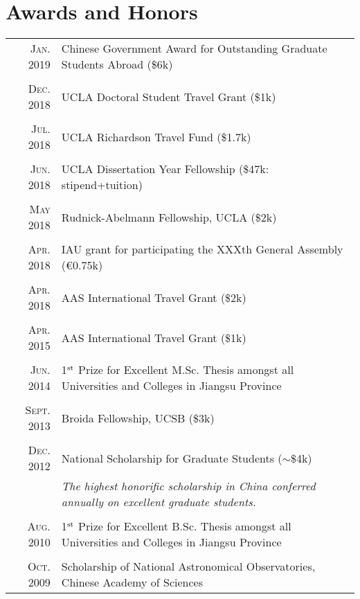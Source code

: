 \documentclass[letterpaper,10pt]{article}
\newcommand{\narrow}{-1.8ex}
\newcommand{\textwrap}{5.8in}       %
\begin{document}
\section{Awards and Honors}

\vspace*{-.5em}
\begin{longtable}{r|p{\textwrap}}

    \textsc{Jan. 2019} & Chinese Government Award for Outstanding Graduate Students Abroad (\$6k)   \\
    \multicolumn{2}{c}{} \\[\narrow]
    \textsc{Dec. 2018} & UCLA Doctoral Student Travel Grant (\$1k)   \\
    \multicolumn{2}{c}{} \\[\narrow]
    \textsc{Jul. 2018} & UCLA Richardson Travel Fund (\$1.7k)   \\
    \multicolumn{2}{c}{} \\[\narrow]
    \textsc{Jun. 2018} & UCLA Dissertation Year Fellowship (\$47k: stipend+tuition)    \\
    \multicolumn{2}{c}{} \\[\narrow]
    \textsc{May 2018} & Rudnick-Abelmann Fellowship, UCLA (\$2k)      \\
    \multicolumn{2}{c}{} \\[\narrow]
    \textsc{Apr. 2018} & IAU grant for participating the XXXth General Assembly (\euro0.75k)  \\
    \multicolumn{2}{c}{} \\[\narrow]
    \textsc{Apr. 2018} & AAS International Travel Grant (\$2k)    \\
    \multicolumn{2}{c}{} \\[\narrow]
    \textsc{Apr. 2015} & AAS International Travel Grant (\$1k)    \\
    \multicolumn{2}{c}{} \\[\narrow]
    \textsc{Jun. 2014} & 1$^{\rm st}$ Prize for Excellent M.Sc. Thesis amongst all Universities and Colleges in Jiangsu Province \\
    \multicolumn{2}{c}{} \\[\narrow]
    \textsc{Sept. 2013} & Broida Fellowship, UCSB (\$3k)  \\
    \multicolumn{2}{c}{} \\[\narrow]
    \textsc{Dec. 2012} & National Scholarship for Graduate Students ($\sim$\$4k)  \\
                     & {\it The highest honorific scholarship in China conferred annually on excellent graduate students.}\\
    \multicolumn{2}{c}{} \\[\narrow]
    \textsc{Aug. 2010} & 1$^{\rm st}$ Prize for Excellent B.Sc. Thesis amongst all Universities and Colleges in Jiangsu Province \\
    \multicolumn{2}{c}{} \\[\narrow]
    \textsc{Oct. 2009} & Scholarship of National Astronomical Observatories, Chinese Academy of Sciences
\end{longtable}
\end{document}
